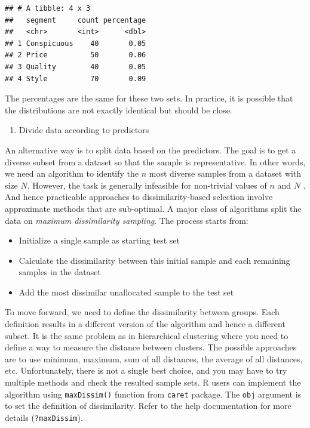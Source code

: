 \documentclass[12pt,]{krantz}
\providecommand{\tightlist}{%
  \setlength{\itemsep}{0pt}\setlength{\parskip}{0pt}}
\begin{document}
\begin{verbatim}
## # A tibble: 4 x 3
##   segment     count percentage
##   <chr>       <int>      <dbl>
## 1 Conspicuous    40       0.05
## 2 Price          50       0.06
## 3 Quality        40       0.05
## 4 Style          70       0.09
\end{verbatim}

The percentages are the same for these two sets. In practice, it is possible that the distributions are not exactly identical but should be close.

\begin{enumerate}
\def\labelenumi{(\arabic{enumi})}
\setcounter{enumi}{1}
\tightlist
\item
  Divide data according to predictors
\end{enumerate}

An alternative way is to split data based on the predictors. The goal is to get a diverse subset from a dataset so that the sample is representative. In other words, we need an algorithm to identify the \(n\) most diverse samples from a dataset with size \(N\). However, the task is generally infeasible for non-trivial values of \(n\) and \(N\) \citep{willett}. And hence practicable approaches to dissimilarity-based selection involve approximate methods that are sub-optimal. A major class of algorithms split the data on \emph{maximum dissimilarity sampling}. The process starts from:

\begin{itemize}
\tightlist
\item
  Initialize a single sample as starting test set
\item
  Calculate the dissimilarity between this initial sample and each remaining samples in the dataset
\item
  Add the most dissimilar unallocated sample to the test set
\end{itemize}

To move forward, we need to define the dissimilarity between groups. Each definition results in a different version of the algorithm and hence a different subset. It is the same problem as in hierarchical clustering where you need to define a way to measure the distance between clusters. The possible approaches are to use minimum, maximum, sum of all distances, the average of all distances, etc. Unfortunately, there is not a single best choice, and you may have to try multiple methods and check the resulted sample sets. R users can implement the algorithm using \texttt{maxDissim()} function from \texttt{caret} package. The \texttt{obj} argument is to set the definition of dissimilarity. Refer to the help documentation for more details (\texttt{?maxDissim}).
\end{document}
